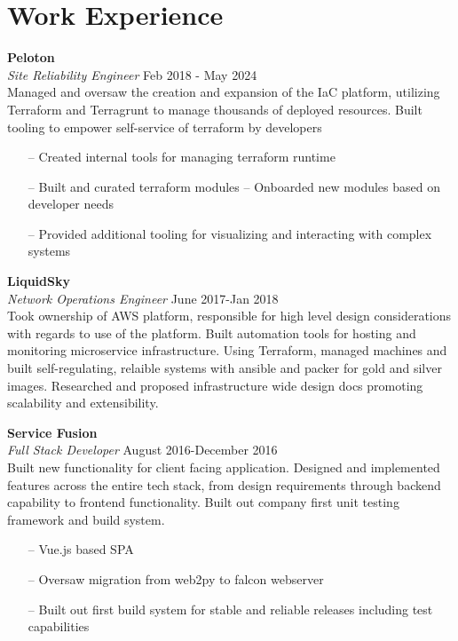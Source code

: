 \section{Work Experience}

\large{\textbf{Peloton}} \\
\textit{Site Reliability Engineer} \hfill Feb 2018 - May 2024 \\[3.75pt]
Managed and oversaw the creation and expansion of the IaC platform, utilizing Terraform and Terragrunt to manage thousands of deployed resources. Built tooling to empower self-service of terraform by developers

\begin{minipage}[t]{\linewidth}
    \begin{itemize}
        \item[--] Created internal tools for managing terraform runtime
        \item[--] Built and curated terraform modules
        \subitem -- Onboarded new modules based on developer needs
        \item[--] Provided additional tooling for visualizing and interacting with complex systems
    \end{itemize}
    \end{minipage}

\large{\textbf{LiquidSky}} \\
\textit{Network Operations Engineer} \hfill June 2017-Jan 2018 \\[3.75pt]
Took ownership of AWS platform, responsible for high level design considerations with regards to use of the platform. Built automation tools for hosting and monitoring microservice infrastructure. Using Terraform, managed machines and built self-regulating, relaible systems with ansible and packer for gold and silver images. Researched and proposed infrastructure wide design docs promoting scalability and extensibility.

\large{\textbf{Service Fusion}} \\
\textit{Full Stack Developer} \hfill August 2016-December 2016 \\[3.75pt]
Built new functionality for client facing application. Designed and implemented features across the entire tech stack, from design requirements through backend capability to frontend functionality. Built out company first unit testing framework and build system.

\begin{minipage}[t]{\linewidth}
    \begin{itemize}
        \item[--] Vue.js based SPA
        \item[--] Oversaw migration from web2py to falcon webserver
        \item[--] Built out first build system for stable and reliable releases including test capabilities
    \end{itemize}
    \end{minipage}

